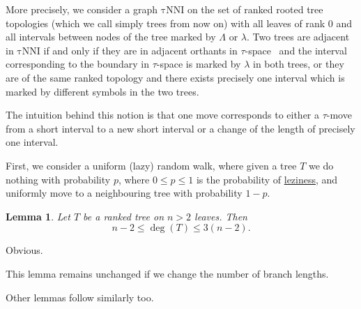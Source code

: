 \documentclass[12pt]{article}
\newtheorem{lemma}{Lemma}
\newcommand{\tN}{\mathrm{\tau NNI}}
\begin{document}
More precisely, we consider a graph $\tN$ on the set of ranked rooted tree topologies 
(which we call simply trees from now on) with
all leaves of rank $0$ and all intervals between nodes of the tree marked by $\Lambda$ or
$\lambda$. Two trees are adjacent in $\tN$ if and only if they are in adjacent orthants in 
$\tau$-space~\cite{GD} and the interval corresponding to the boundary in $\tau$-space
is marked by $\lambda$ in both trees, or they are of the same ranked topology and there 
exists precisely one interval which is marked by different symbols in the two trees. 

The intuition behind this notion is that one move corresponds to either 
a $\tau$-move from a short interval to a new short interval or a change of the length of 
precisely one interval. 

First, we consider a uniform (lazy) random walk, where given a tree $T$ we do nothing 
with probability $p$, where $0\leq p\leq 1$ is the probability of \href{https://academichelp.net/wp-content/uploads/2014/01/laziness.jpg}{leziness}, and uniformly move to a neighbouring tree with probability $1-p$. 

\begin{lemma}
Let $T$ be a ranked tree on $n>2$ leaves. Then \[n-2\leq \deg(T)\leq3(n-2).\] 
\end{lemma}

\proof
Obvious.
\endproof

This lemma remains unchanged if we change the number of branch lengths. 

Other lemmas follow similarly too. 
\end{document}
